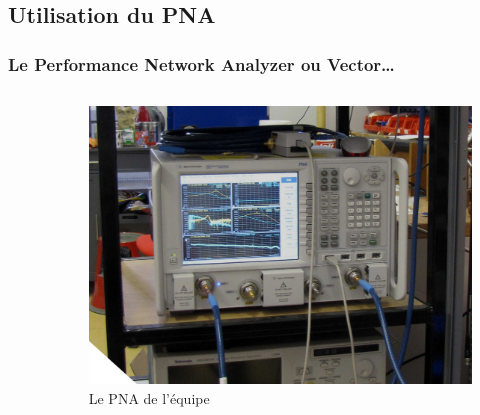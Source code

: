 \documentclass[8pt,a9paper]{beamer} \usepackage[utf8]{inputenc} \usepackage[francais]{babel} \usepackage[T1]{fontenc}
\begin{document}
\subsection{Utilisation du PNA}
\begin{frame}
\frametitle{Le Performance Network Analyzer \tiny{ ou Vector…} }
\begin{columns}
\begin{column}{0.6\textwidth}
    \begin{description}
        \item[]~\\
    \end{description}
\end{column}
\begin{column}{0.4\textwidth}
\begin{figure}[h]
    \begin{center}
        \includegraphics[width=\textwidth]{Images/VNA}
        \caption{Le PNA de l’équipe}
    \end{center}
\end{figure}
\end{column}
\end{columns}
\end{frame}
\end{document}
